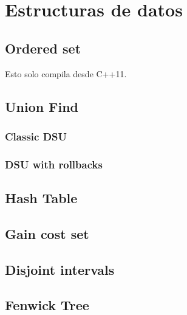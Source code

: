 \newpage
\section{Estructuras de datos}

\subsection{Ordered set}
Esto solo compila desde C++11.


\subsection{Union Find}

\subsubsection{Classic DSU}


\subsubsection{DSU with rollbacks}


\subsection{Hash Table}


\subsection{Gain cost set}


\subsection{Disjoint intervals}


\subsection{Fenwick Tree}


